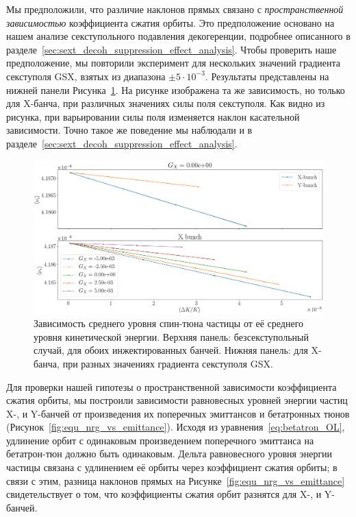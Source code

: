 Мы предположили, что различие наклонов прямых связано с \emph{пространственной зависимостью} коэффициента сжатия орбиты. Это предположение основано на нашем анализе секступольного подавления декогеренции, подробнее описанного в разделе~\ref{sec:sext_decoh_suppression_effect_analysis}. Чтобы проверить наше предположение, мы повторили эксперимент для нескольких значений градиента секступоля GSX, взятых из диапазона $\pm 5\cdot 10^{-3}$.  Результаты представлены на  нижней панели Рисунка~\ref{fig:stune_traj_equ_main}. На рисунке изображена та же зависимость, но только для X-банча, при различных значениях силы поля секступоля. Как видно из рисунка, при варьировании силы поля изменяется наклон касательной зависимости. Точно такое же поведение мы наблюдали и в разделе~\ref{sec:sext_decoh_suppression_effect_analysis}.

\begin{figure}[h]
	\centering
	\includegraphics[height=.3\paperheight]{images/stune_traj_equ/stune_vs_equ_energy}
	\caption[Зависимость среднего уровня спин-тюна частицы от её среднего уровня кинетической энергии.]{Зависимость среднего уровня спин-тюна частицы от её среднего уровня кинетической энергии. Верхняя панель: безсекступольный случай, для обоих инжектированных банчей. Нижняя панель: для X-банча, при разных значениях градиента секступоля GSX.\label{fig:stune_traj_equ_main}}
\end{figure}

Для проверки нашей гипотезы о пространственной зависимости коэффициента сжатия орбиты, мы построили зависимости равновесных уровней энергии частиц X-, и Y-банчей от произведения их поперечных эмиттансов и бетатронных тюнов (Рисунок~\ref{fig:equ_nrg_vs_emittance}). Исходя из уравнения~\eqref{eq:betatron_OL}, удлинение орбит с одинаковым произведением поперечного эмиттанса на бетатрон-тюн должно быть одинаковым. Дельта равновесного уровня энергии частицы связана с удлинением её орбиты через коэффициент сжатия орбиты; в связи с этим, разница наклонов прямых на Рисунке~\ref{fig:equ_nrg_vs_emittance} свидетельствует о том, что коэффициенты сжатия орбит разнятся для X-, и Y-банчей. 

